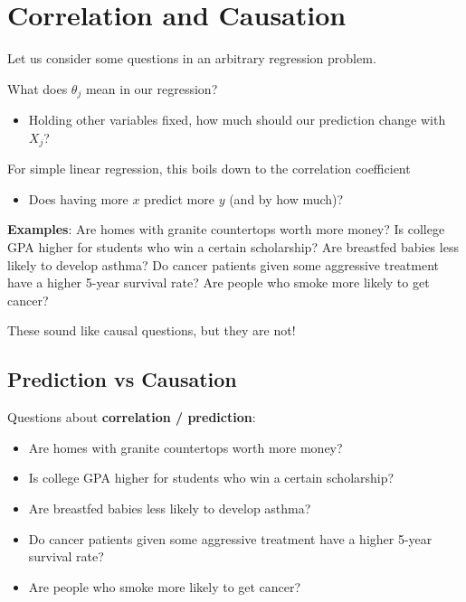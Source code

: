 \documentclass[
  letterpaper,
  DIV=11,
  numbers=noendperiod]{scrreprt}
\providecommand{\tightlist}{%
  \setlength{\itemsep}{0pt}\setlength{\parskip}{0pt}}\usepackage{longtable,booktabs,array}
\begin{document}
\hypertarget{correlation-and-causation}{%
\section{Correlation and Causation}\label{correlation-and-causation}}

Let us consider some questions in an arbitrary regression problem.

What does \(\theta_{j}\) mean in our regression?

\begin{itemize}
\tightlist
\item
  Holding other variables fixed, how much should our prediction change
  with \(X_{j}\)?
\end{itemize}

For simple linear regression, this boils down to the correlation
coefficient

\begin{itemize}
\tightlist
\item
  Does having more \(x\) predict more \(y\) (and by how much)?
\end{itemize}

\textbf{Examples}: Are homes with granite countertops worth more money?
Is college GPA higher for students who win a certain scholarship? Are
breastfed babies less likely to develop asthma? Do cancer patients given
some aggressive treatment have a higher 5-year survival rate? Are people
who smoke more likely to get cancer?

These sound like causal questions, but they are not!

\hypertarget{prediction-vs-causation}{%
\subsection{Prediction vs Causation}\label{prediction-vs-causation}}

Questions about \textbf{correlation / prediction}:

\begin{itemize}
\tightlist
\item
  Are homes with granite countertops worth more money?
\item
  Is college GPA higher for students who win a certain scholarship?
\item
  Are breastfed babies less likely to develop asthma?
\item
  Do cancer patients given some aggressive treatment have a higher
  5-year survival rate?
\item
  Are people who smoke more likely to get cancer?
\end{itemize}
\end{document}
